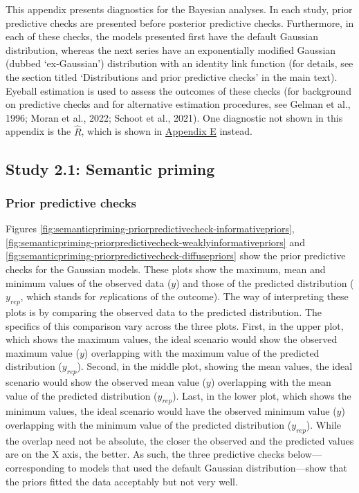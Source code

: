 \documentclass[
  12pt,
  man,floatsintext]{apa7}
\begin{document}
This appendix presents diagnostics for the Bayesian analyses. In each study, prior predictive checks are presented before posterior predictive checks. Furthermore, in each of these checks, the models presented first have the default Gaussian distribution, whereas the next series have an exponentially modified Gaussian (dubbed `ex-Gaussian') distribution with an identity link function (for details, see the section titled `Distributions and prior predictive checks' in the main text). Eyeball estimation is used to assess the outcomes of these checks (for background on predictive checks and for alternative estimation procedures, see Gelman et al., 1996; Moran et al., 2022; Schoot et al., 2021). One diagnostic not shown in this appendix is the \(\widehat R\), which is shown in \protect\hyperlink{appendix-E-Bayesian-analysis-results}{\underline{Appendix E}} instead.

\hypertarget{study1-bayesian-diagnostics}{%
\subsection{Study 2.1: Semantic priming}\label{study1-bayesian-diagnostics}}

\hypertarget{prior-predictive-checks}{%
\subsubsection{Prior predictive checks}\label{prior-predictive-checks}}

Figures \ref{fig:semanticpriming-priorpredictivecheck-informativepriors}, \ref{fig:semanticpriming-priorpredictivecheck-weaklyinformativepriors} and \ref{fig:semanticpriming-priorpredictivecheck-diffusepriors} show the prior predictive checks for the Gaussian models. These plots show the maximum, mean and minimum values of the observed data (\(y\)) and those of the predicted distribution (\(y_{rep}\), which stands for \emph{rep}lications of the outcome). The way of interpreting these plots is by comparing the observed data to the predicted distribution. The specifics of this comparison vary across the three plots. First, in the upper plot, which shows the maximum values, the ideal scenario would show the observed maximum value (\(y\)) overlapping with the maximum value of the predicted distribution (\(y_{rep}\)). Second, in the middle plot, showing the mean values, the ideal scenario would show the observed mean value (\(y\)) overlapping with the mean value of the predicted distribution (\(y_{rep}\)). Last, in the lower plot, which shows the minimum values, the ideal scenario would have the observed minimum value (\(y\)) overlapping with the minimum value of the predicted distribution (\(y_{rep}\)). While the overlap need not be absolute, the closer the observed and the predicted values are on the X axis, the better. As such, the three predictive checks below---corresponding to models that used the default Gaussian distribution---show that the priors fitted the data acceptably but not very well.
\end{document}
